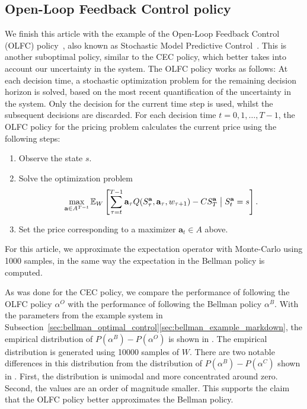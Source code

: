 \documentclass[main.tex]{subfiles}
\begin{document}
\subsection{Open-Loop Feedback Control policy}
We finish this article with the example of the Open-Loop
Feedback Control (OLFC) policy~\cite[Ch.~6]{bertsekas2005dynamic},
also known as Stochastic Model
Predictive Control~\cite{farmer2017uncertainty}. This is another suboptimal policy,
similar to the CEC policy, which better takes into account our uncertainty in the system.
The OLFC policy works as follows: At each decision time, a stochastic
optimization problem for the remaining decision horizon is
solved, based on the most recent quantification of the uncertainty in the
system. Only the decision for the current time step is used, whilst
the subsequent decisions are discarded.
For each decision time $t=0,1,\dots,T-1$, the OLFC policy for the
pricing problem calculates the current price using the following steps:
\begin{enumerate}
\item Observe the state $s$.
\item Solve the optimization problem
  \begin{equation}\label{eq:olfc_optimization_problem}
    \max_{\mathbf a\in A^{T-t}}\mathbb E_W\left[
      \sum_{\tau=t}^{T-1}\mathbf a_\tau Q(S_\tau^{\mathbf a},\mathbf
      a_\tau,w_{\tau+1})-CS_T^{\mathbf a} \bigm\vert S_t^{\mathbf a}=s \right].
  \end{equation}
\item Set the price corresponding to a maximizer
  $\mathbf a_t\in A$ above.
\end{enumerate}
For this article, we approximate the expectation operator with
Monte-Carlo using \num{1000} samples, in the same way the expectation
in the Bellman policy is computed.

As was done for the CEC policy, we compare the performance of following the
OLFC policy $\alpha^O$ with the performance of following the Bellman
policy $\alpha^B$. With the parameters from the example system in
Subsection~\ref{sec:bellman_optimal_control}\ref{sec:bellman_example_markdown},
the empirical distribution of $P(\alpha^B)-P(\alpha^O)$ is shown in
. The empirical distribution is generated
using \num{10000} samples of $W$.
There are two notable differences in this distribution from the
distribution of $P(\alpha^B)-P(\alpha^C)$ shown in .
First, the distribution is unimodal and more concentrated around zero. Second,
the values are an order of magnitude smaller.
This supports the claim that the OLFC policy better approximates the
Bellman policy.
\end{document}
